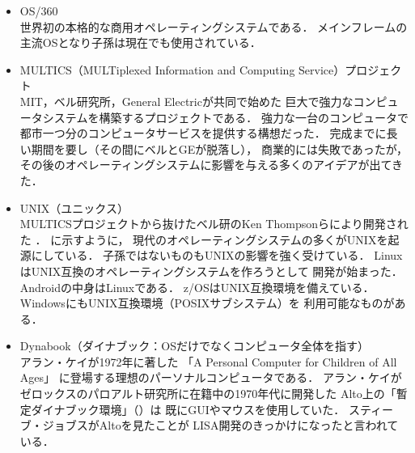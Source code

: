 \begin{itemize}
\item OS/360 \\
  世界初の本格的な商用オペレーティングシステムである．
  メインフレームの主流OSとなり子孫は現在でも使用されている\cite{os360}．

\item MULTICS（MULTiplexed Information and Computing Service）プロジェクト
  \cite{third} \\
  MIT，ベル研究所，General Electricが共同で始めた
  巨大で強力なコンピュータシステムを構築するプロジェクトである．
  強力な一台のコンピュータで
  都市一つ分のコンピュータサービスを提供する構想だった．
  完成までに長い期間を要し（その間にベルとGEが脱落し），
  商業的には失敗であったが，
  その後のオペレーティングシステムに影響を与える多くのアイデアが出てきた．

\item UNIX（ユニックス） \\
  MULTICSプロジェクトから抜けたベル研のKen Thompsonらにより開発された
  \cite{unix}．
  に示すように，
  現代のオペレーティングシステムの多くがUNIXを起源にしている．
  子孫ではないものもUNIXの影響を強く受けている．
  LinuxはUNIX互換のオペレーティングシステムを作ろうとして
  開発が始まった\cite{linux}．
  Androidの中身はLinuxである\cite{android}．
  z/OSはUNIX互換環境を備えている\cite{zos}．
  WindowsにもUNIX互換環境（POSIXサブシステム）を
  利用可能なものがある\cite{windows}．

\item Dynabook（ダイナブック：OSだけでなくコンピュータ全体を指す）
  \cite{dynabook2} \\
  アラン・ケイが1972年に著した
  「A Personal Computer for Children of All Ages」\cite{key72, key72J}
  に登場する理想のパーソナルコンピュータである．
  アラン・ケイがゼロックスのパロアルト研究所に在籍中の1970年代に開発した
  Alto上の「暫定ダイナブック環境」（）は
  既にGUIやマウスを使用していた．
  スティーブ・ジョブスがAltoを見たことが
  LISA開発のきっかけになったと言われている\cite{dynabook}．


\end{itemize}

